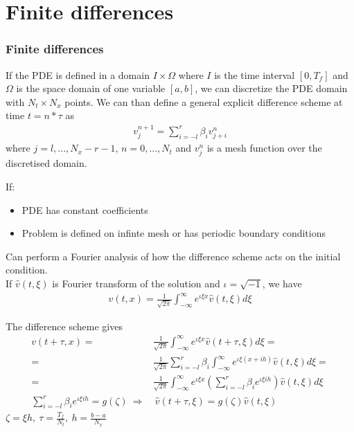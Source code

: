 \documentclass{beamer}
\begin{document}
\section{Finite differences}
\begin{frame}
\frametitle{Finite differences}
If the PDE is defined in a domain $I \times \Omega$ where $I$ is the time interval $[0, T_f]$ and $\Omega$ is the space domain of one variable $[a,b]$, we can discretize the PDE domain with $N_t \times N_x$ points. We can than define a general explicit difference scheme at time $t = n * \tau$ as
\begin{align*}
v_j^{n+1} = \sum_{i = -l}^r \beta_i v_{j+i}^n
\end{align*}
where $j = l, ..., N_x - r -1$, $n = 0, ..., N_t$ and $v_j^n$ is a mesh function over the discretised domain.
\end{frame}
\begin{frame}
If: \begin{itemize}
\item PDE has constant coefficients
\item Problem is defined on infinte mesh or has periodic boundary conditions
\end{itemize}
Can perform a Fourier analysis of how the difference scheme acts on the initial condition. \\ If $\hat{v}(t,\xi)$ is Fourier transform of the solution and $\iota = \sqrt{-1}$, we have
\begin{align*}
v(t,x) = \frac{1}{\sqrt{2\pi}}\int_{-\infty}^{\infty}e^{\iota\xi x}\hat{v}(t,\xi)d\xi
\end{align*}
\end{frame}
\begin{frame}
The difference scheme gives
\begin{align*}
v(t + \tau, x) = \ & \frac{1}{\sqrt{2\pi}}\int_{-\infty}^{\infty}e^{\iota\xi x}\hat{v}(t + \tau,\xi)d\xi =  \\ 
= \ & \frac{1}{\sqrt{2\pi}}\sum_{i=-l}^{r}\beta_i\int_{-\infty}^{\infty}e^{\iota\xi (x + ih)}\hat{v}(t,\xi)d\xi = \\
= \ & \frac{1}{\sqrt{2\pi}}\int_{-\infty}^{\infty} e^{\iota \xi x} \left(\sum_{i=-l}^{r}\beta_i e^{\iota\xi ih}\right)\hat{v}(t,\xi)d\xi \\
\sum_{i=-l}^{r}\beta_i e^{\iota\xi ih} = g(\zeta) \ \Rightarrow & \ \hat{v}(t + \tau, \xi) = g(\zeta)\hat{v}(t,\xi)
\end{align*}
$\zeta = \xi h, \ \tau = \frac{T_f}{N_t}, \ h = \frac{b - a}{N_x}$
\end{frame}
\end{document}
